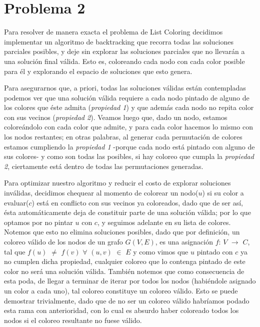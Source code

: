 \documentclass{article}
\theoremstyle{definition}
\theoremstyle{remark}
\begin{document}
\section{Problema 2}

Para resolver de manera exacta el problema de List Coloring decidimos implementar un algoritmo de backtracking que recorra todas las soluciones parciales posibles, y deje sin explorar las soluciones parciales que no llevarán a una solución final válida. Esto es, coloreando cada nodo con cada color posible para él y explorando el espacio de soluciones que esto genera. 

Para asegurarnos que, a priori, todas las soluciones válidas están contempladas podemos ver que una solución válida requiere a cada nodo pintado de alguno de los colores que éste admita (\textit{propiedad 1}) y que además cada nodo no repita color con sus vecinos (\textit{propiedad 2}). Veamos luego que, dado un nodo, estamos coloreándolo con cada color que admite, y para cada color hacemos lo mismo con los nodos restantes; en otras palabras, al generar cada permutación de colores estamos cumpliendo la \textit{propiedad 1} -porque cada nodo está pintado con alguno de sus colores- y como son todas las posibles, si hay coloreo que cumpla la \textit{propiedad 2}, ciertamente está dentro de todas las permutaciones generadas. 

Para optimizar nuestro algoritmo y reducir el costo de explorar soluciones inválidas, decidimos chequear al momento de colorear un nodo($u$) si su color a evaluar($c$) está en conflicto con sus vecinos ya coloreados, dado que de ser así, ésta automáticamente deja de constituir parte de una solución válida; por lo que optamos por no pintar $u$ con $c$, y seguimos adelante en su lista de colores.  
Notemos que esto no elimina soluciones posibles, dado que por definición, un coloreo válido de los nodos de un grafo $G(V,E)$, es una asignación $f$: $V$ $\rightarrow$ $C$, tal que $f(u)$ $\neq$ $f(v)$ $\forall$ $(u,v)$ $\in$ $E$ y como vimos que $u$ pintado con $c$ ya no cumplen dicha propiedad, cualquier coloreo que lo contenga pintado de este color no será una solución válida. También notemos que como consecuencia de esta poda, de llegar a terminar de iterar por todos los nodos (habiéndole asignado un color a cada uno), tal coloreo constituye un coloreo válido. Esto se puede demostrar trivialmente, dado que de no ser un coloreo válido habríamos podado esta rama con anterioridad, con lo cual es absurdo haber coloreado todos los nodos si el coloreo resultante no fuese válido. 
\end{document}
